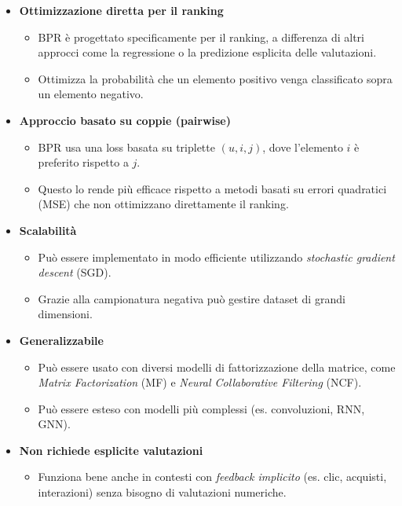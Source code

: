 \documentclass{article}
\begin{document}
\begin{itemize}
    \item \textbf{Ottimizzazione diretta per il ranking}  
    \begin{itemize}
        \item BPR è progettato specificamente per il ranking, a differenza di altri approcci come la regressione o la predizione esplicita delle valutazioni.
        \item Ottimizza la probabilità che un elemento positivo venga classificato sopra un elemento negativo.
    \end{itemize}
    
    \item \textbf{Approccio basato su coppie (pairwise)}
    \begin{itemize}
        \item BPR usa una loss basata su triplette \((u, i, j)\), dove l'elemento \(i\) è preferito rispetto a \(j\).
        \item Questo lo rende più efficace rispetto a metodi basati su errori quadratici (MSE) che non ottimizzano direttamente il ranking.
    \end{itemize}
    
    \item \textbf{Scalabilità}
    \begin{itemize}
        \item Può essere implementato in modo efficiente utilizzando \textit{stochastic gradient descent} (SGD).
        \item Grazie alla campionatura negativa può gestire dataset di grandi dimensioni.
    \end{itemize}
    
    \item \textbf{Generalizzabile}
    \begin{itemize}
        \item Può essere usato con diversi modelli di fattorizzazione della matrice, come \textit{Matrix Factorization} (MF) e \textit{Neural Collaborative Filtering} (NCF).
        \item Può essere esteso con modelli più complessi (es. convoluzioni, RNN, GNN).
    \end{itemize}
    
    \item \textbf{Non richiede esplicite valutazioni}
    \begin{itemize}
        \item Funziona bene anche in contesti con \textit{feedback implicito} (es. clic, acquisti, interazioni) senza bisogno di valutazioni numeriche.
    \end{itemize}
\end{itemize}
\end{document}
